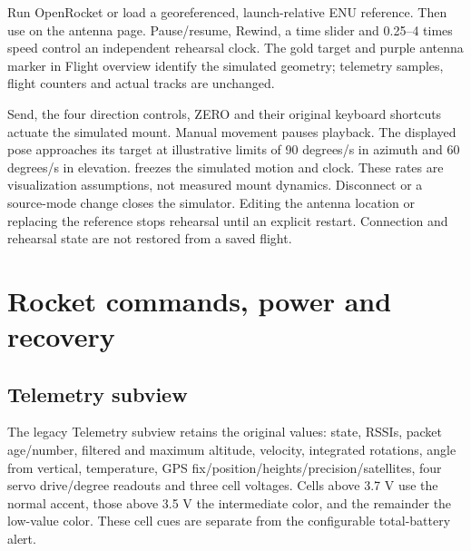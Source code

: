 Run OpenRocket or load a georeferenced, launch-relative ENU reference. Then use
 on the antenna page. Pause/resume, Rewind, a time slider
and 0.25--4 times speed control an independent rehearsal clock. The gold target
and purple antenna marker in Flight overview identify the simulated geometry;
telemetry samples, flight counters and actual tracks are unchanged.

Send, the four direction controls, ZERO and their original keyboard shortcuts
actuate the simulated mount. Manual movement pauses playback. The displayed
pose approaches its target at illustrative limits of 90 degrees/s in azimuth
and 60 degrees/s in elevation.  freezes the simulated
motion and clock. These rates are visualization assumptions, not measured mount
dynamics. Disconnect or a source-mode change closes the simulator. Editing the
antenna location or replacing the reference stops rehearsal until an explicit
restart. Connection and rehearsal state are not restored from a saved flight.


\section{Rocket commands, power and recovery}\label{sec:rocket}
\subsection{Telemetry subview}
The legacy Telemetry subview retains the original values: state, RSSIs, packet
age/number, filtered and maximum altitude, velocity, integrated rotations,
angle from vertical, temperature, GPS fix/position/heights/precision/satellites,
four servo drive/degree readouts and three cell voltages. Cells above 3.7 V use
the normal accent, those above 3.5 V the intermediate color, and the remainder
the low-value color. These cell cues are separate from the configurable
total-battery alert.

